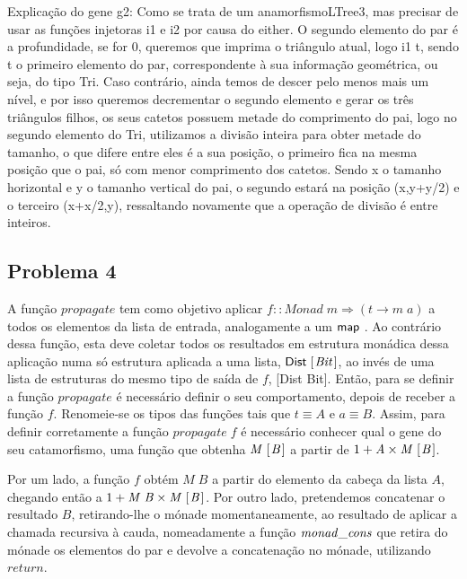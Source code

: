 \documentclass[a4paper]{article}
\newcommand{\Conid}[1]{\mathit{#1}}
\newcommand{\Varid}[1]{\mathit{#1}}
\begin{document}
Explicação do gene g2:
Como se  trata de um anamorfismoLTree3, mas precisar de usar as funções injetoras i1 e i2 por causa do either.
O segundo elemento do par é a profundidade, se for 0, queremos que imprima o triângulo atual, logo i1 t, sendo t o primeiro elemento
do par, correspondente à sua informação geométrica, ou seja, do tipo Tri.
Caso contrário, ainda temos de descer pelo menos mais um nível, e por isso queremos decrementar o segundo elemento e gerar os três
triângulos filhos, os seus catetos possuem metade do comprimento do pai, logo no segundo elemento do Tri, utilizamos a divisão inteira
para obter metade do tamanho, o que difere entre eles é a sua posição, o primeiro fica na mesma posição que o pai, só com menor comprimento dos
catetos. Sendo x o tamanho horizontal e y o tamanho vertical do pai, o segundo estará na posição (x,y+y/2) e o terceiro (x+x/2,y), ressaltando novamente que 
a operação de divisão é entre inteiros. 

\subsection*{Problema 4}

A função \ensuremath{\Varid{propagate}} tem como objetivo aplicar \ensuremath{\Varid{f}\mathbin{::}\Conid{Monad}\;\Varid{m}\Rightarrow (\Varid{t}\to \Varid{m}\;\Varid{a})} a todos os elementos da lista de entrada, analogamente a um \ensuremath{\map }.
Ao contrário dessa função, esta deve coletar todos os resultados em estrutura monádica dessa aplicação numa só estrutura
aplicada a uma lista, \ensuremath{\fun{Dist}\;[\mskip1.5mu \Conid{Bit}\mskip1.5mu]}, ao invés de uma lista de estruturas do mesmo tipo de saída de \ensuremath{\Varid{f}}, [Dist Bit].
Então, para se definir a função \ensuremath{\Varid{propagate}} é necessário definir o seu comportamento, depois de receber a função \ensuremath{\Varid{f}}.
Renomeie-se os tipos das funções tais que \ensuremath{\Varid{t}\equiv \Conid{A}} e \ensuremath{\Varid{a}\equiv \mathit B}.
Assim, para definir corretamente a função \ensuremath{\Varid{propagate}\;\Varid{f}} é necessário conhecer qual o gene do seu catamorfismo, 
uma função que obtenha \ensuremath{\Conid{M}\;[\mskip1.5mu \mathit B\mskip1.5mu]} a partir de \ensuremath{\mathrm{1}\mathbin{+}\Conid{A}\times\Conid{M}\;[\mskip1.5mu \mathit B\mskip1.5mu]}. 

Por um lado, a função \ensuremath{\Varid{f}} obtém \ensuremath{\Conid{M}\;\mathit B} a partir do elemento da cabeça da lista \ensuremath{\Conid{A}}, chegando então a \ensuremath{\mathrm{1}\mathbin{+}\Conid{M}\;\mathit B\times\Conid{M}\;[\mskip1.5mu \mathit B\mskip1.5mu]}.
Por outro lado, pretendemos concatenar o resultado \ensuremath{\mathit B}, retirando-lhe o mónade momentaneamente, 
ao resultado de aplicar a chamada recursiva à cauda, nomeadamente a função \ensuremath{\Varid{monad\char95 cons}} que retira do mónade os elementos do par
e devolve a concatenação no mónade, utilizando \ensuremath{\Varid{return}}.
\end{document}
